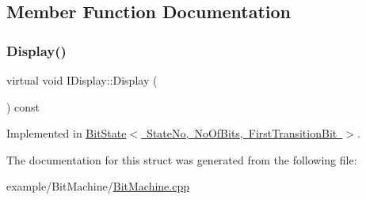 \subsection{Member Function Documentation}
\mbox{\label{struct_i_display_a661bdbd2f3b46f7e0d8f8211a212f184}} 
\subsubsection{\texorpdfstring{Display()}{Display()}}
{\footnotesize\ttfamily virtual void I\+Display\+::\+Display (\begin{DoxyParamCaption}{ }\end{DoxyParamCaption}) const\hspace{0.3cm}{\ttfamily [pure virtual]}}



Implemented in \mbox{\hyperlink{struct_bit_state_a3f26c599cf4a72a263d4fc2c2f7e693d}{Bit\+State$<$ State\+No, No\+Of\+Bits, First\+Transition\+Bit $>$}}.



The documentation for this struct was generated from the following file\+:\begin{DoxyCompactItemize}
\item 
example/\+Bit\+Machine/\mbox{\hyperlink{_bit_machine_8cpp}{Bit\+Machine.\+cpp}}\end{DoxyCompactItemize}
